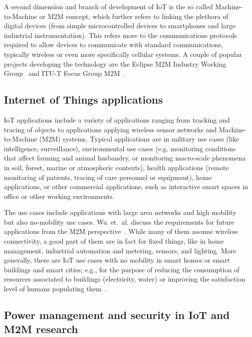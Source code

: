 \documentclass[final]{siamltex}
\begin{document}
A second dimension and branch of development of IoT is the so called
Machine-to-Machine or M2M concept, which further refers to linking the
plethora of digital devices (from
simple microcontrolled devices to smartphones and large industrial
instrumentation). This refers more to the communications protocols required to
allow devices to communicate with standard communications, typically wireless or
even more specifically cellular systems. A couple of popular projects developing
the technology are the Eclipse M2M Industry Working Group~\cite{EclipseM2M} and
ITU-T Focus Group M2M~\cite{ITU-T_FG_M2M}.

\subsection{Internet of Things applications}
\label{ssec:applications}

IoT applications include a variety of applications
ranging from tracking and tracing of objects to
applications applying wireless sensor networks and Machine-to-Machine
(M2M) systems. Typical applications are in military use cases (like
intelligence, surveillance), environmental use cases (e.g. monitoring
conditions that affect farming and animal husbandry, or monitoring
macro-scale phenomena in soil, forest, marine or atmospheric
contexts), health applications (remote monitoring of patients, tracing
of care personnel or equipment), home applications, or other
commercial applications, such as interactive smart spaces in office or
other working environments.

The use cases include applications with large area networks and high
mobility but also no-mobility use cases. Wu~et.~al. discuss the
requirements for future applications from the M2M
perspective~\cite{wu2011m2m}. While many of them assume wireless
connectivity, a good part of them are in fact for fixed things, like
in home management, industrial automation and metering, sensors, and
lighting. More generally, there are IoT use cases with no mobility in
smart homes or smart buildings and smart cities; e.g., for the purpose
of reducing the consumption of resources associated to buildings
(electricity, water) or improving the satisfaction level of humans
populating them~\cite{miorandi2012internet}.

\subsection{Power management and security in IoT and M2M research}
\label{ssec:powersec}
\end{document}
